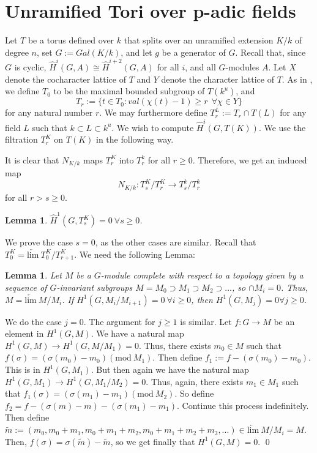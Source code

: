 \documentclass[11pt]{amsart}
\theoremstyle{plain}
\newtheorem{lemma}[enumi]{Lemma}
\begin{document}
\section{Unramified Tori over p-adic fields}

Let $T$ be a torus defined over $k$ that splits over an unramified extension $K/k$ of degree $n$, set $G := Gal(K/k)$, and let $g$ be a generator of $G$.  Recall that, since $G$ is cyclic, $\hat{H}^{i}(G,A)\cong \hat{H}^{i+2}(G,A)$ for all $i$, and all $G$-modules $A$.  Let $X$ denote the cocharacter lattice of $T$ and $Y$ denote the character lattice of $T$.  As in \cite[Section 3]{moyprasad1}, we define $T_0$ to be the maximal bounded subgroup of $T(k^u)$, and $$T_r := \{t \in T_0 : val(\chi(t) - 1) \geq r \ \ \forall \chi \in Y \}$$ for any natural number $r$.  We may furthermore define $T_r^L := T_r \cap T(L)$ for any field $L$ such that $k \subset L \subset k^u$.  We wish to compute $\hat{H}^i(G, T(K))$.  We use the filtration $T_r^K$ on $T(K)$ in the following way.

It is clear that $N_{K/k}$ maps $T_r^K$ into $T_r^k$ for all $r \geq 0$.  Therefore, we get an induced map $$N_{K/k} : T_s^K / T_{r}^K \rightarrow T_s^k / T_{r}^k$$ for all $r > s \geq 0$.

\begin{lemma}\label{H1compactpart}
$\hat{H}^1(G, T_{s}^K) = 0 \ \forall s \geq 0$.
\end{lemma}

\proof
We prove the case $s = 0$, as the other cases are similar.  Recall that $T_0^K = \underleftarrow{\mathrm{lim}} \ T_0^K / T_{r+1}^K$.  We need the following Lemma:

\begin{lemma}\label{abstractcohomology}
Let $M$ be a $G$-module complete with respect to a topology given by a sequence of $G$-invariant subgroups $M = M_0 \supset M_1 \supset M_2 \supset ...$, so $\cap M_i = 0$.  Thus, $M = \underleftarrow{\mathrm{lim}} \ M / M_i$.  If $H^1(G, M_i / M_{i+1}) = 0 \ \forall i \geq 0$, then $H^1(G, M_j) = 0 \forall j \geq 0$.
\end{lemma}

\proof
We do the case $j = 0$.  The argument for $j \geq 1$ is similar.  Let $f : G \rightarrow M$ be an element in $H^1(G,M)$.  We have a natural map $H^1(G, M ) \rightarrow H^1(G, M / M_1) = 0$.  Thus, there exists $m_0 \in M$ such that $f(\sigma) = (\sigma(m_0) - m_0) (\mathrm{mod}  \ M_1)$.  Then define $f_1 := f - (\sigma(m_0) - m_0)$.  This is in $H^1(G, M_1)$. But then again we have the natural map $H^1(G, M_1) \rightarrow H^1(G, M_1 / M_2) = 0$.  Thus, again, there exists $m_1 \in M_1$ such that $f_1(\sigma) = (\sigma(m_1) - m_1) (\mathrm{mod} \ M_2)$.  So define $f_2 = f - (\sigma(m) - m) - (\sigma(m_1) - m_1)$.  Continue this process indefinitely.  Then define $\tilde{m} := (m_0, m_0 + m_1, m_0 + m_1 + m_2, m_0 + m_1 + m_2 + m_3, ...) \in \underleftarrow{\mathrm{lim}} \ M / M_i = M$.  Then, $f(\sigma) = \sigma(\tilde{m}) - \tilde{m}$, so we get finally that $H^1(G,M) = 0$.
\qed
\end{document}
